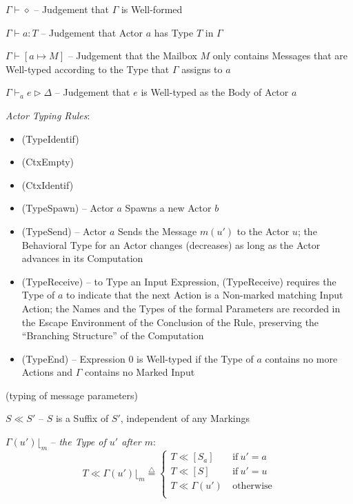 $\Gamma \vdash \diamond$ -- Judgement that $\Gamma$ is Well-formed

$\Gamma \vdash a:T$ -- Judgement that Actor $a$ has Type $T$ in
$\Gamma$

$\Gamma \vdash [a \mapsto M]$ -- Judgement that the Mailbox $M$ only
contains Messages that are Well-typed according to the Type that
$\Gamma$ assigns to $a$

$\Gamma \vdash_a e \rhd \Delta$ -- Judgement that $e$ is Well-typed as
the Body of Actor $a$

\emph{Actor Typing Rules}:
\begin{itemize}
  \item (TypeIdentif)
  \item (CtxEmpty)
  \item (CtxIdentif)
  \item (TypeSpawn) -- Actor $a$ Spawns a new Actor $b$
  \item (TypeSend) -- Actor $a$ Sends the Message $m(u')$ to the Actor
    $u$; the Behavioral Type for an Actor changes (decreases) as long
    as the Actor advances in its Computation %
  \item (TypeReceive) -- to Type an Input Expression, (TypeReceive)
    requires the Type of $a$ to indicate that the next Action is a
    Non-marked matching Input Action; the Names and the Types of the
    formal Parameters are recorded in the Escape Environment of the
    Conclusion of the Rule, preserving the ``Branching Structure''
    of the Computation %
  \item (TypeEnd) -- Expression $0$ is Well-typed if the Type of $a$
    contains no more Actions and $\Gamma$ contains no Marked Input
\end{itemize}

(typing of message parameters) %

$S \ll S'$ -- $S$ is a Suffix of $S'$, independent of any Markings

$\Gamma(u')\lfloor_m$ -- \emph{the Type of $u'$ after $m$}:
\[
  T \ll \Gamma(u')\lfloor_m \overset{\triangle}{=}
  \begin{cases}
    T \ll [S_a]      &\ \text{if}\ u' = a \\
    T \ll [S]        &\ \text{if}\ u' = u \\
    T \ll \Gamma(u') &\ \text{otherwise} \\
  \end{cases}
\]

